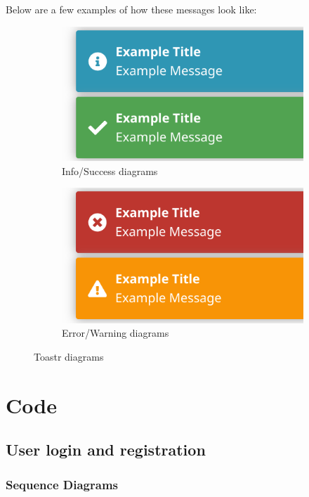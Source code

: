 \documentclass[multi, tikz, a4paper, oneside]{article}
\begin{document}
Below are a few examples of how these messages look like:

\begin{figure}[h]
  \centering
  \begin{subfigure}{.45\textwidth}
    \centering
    \includegraphics[width=0.9\linewidth]{diagrams/success-info.png}
    \caption{Info/Success diagrams}
    \label{fig:sub2}%
  \end{subfigure}
  \begin{subfigure}{.45\textwidth}
    \centering
    \includegraphics[width=0.9\linewidth]{diagrams/warning-error.png}
    \caption{Error/Warning diagrams}
    \label{fig:sub1}
  \end{subfigure}%
  \caption{Toastr diagrams}
  \label{fig:figma3}
\end{figure}


\section{Code}

\subsection{User login and registration}
\subsubsection{Sequence Diagrams}
\end{document}
